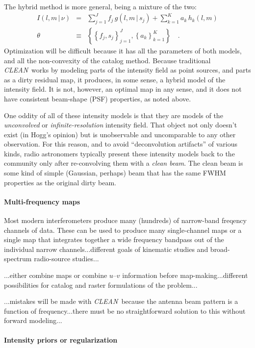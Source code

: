 \documentclass[12pt]{article}
\newcommand{\project}[1]{\textsl{#1}}
\newcommand{\CLEAN}{\project{CLEAN}}
\newcommand{\set}[1]{\left\{{#1}\right\}}
\newcommand{\given}{\,|\,}
\begin{document}
The hybrid method is more general, being a mixture of the two:
\begin{eqnarray}
I(l,m\given\nu) &=& \sum_{j=1}^J f_j\,g(l,m\given s_j)
                  + \sum_{k=1}^K a_k\,h_k(l,m)
\\
\theta &\equiv& \set{\set{f_j, s_j}_{j=1}^J, \set{a_k}_{k=1}^K}
\quad.
\end{eqnarray}
Optimization will be difficult because it has all the parameters of
both models, and all the non-convexity of the catalog method.  Because
traditional \CLEAN\ works by modeling parts of the intensity field as
point sources, and parts as a dirty residual map, it produces, in some
sense, a hybrid model of the intensity field.  It is not, however, an
optimal map in any sense, and it does not have consistent beam-shape
(PSF) properties, as noted above.

One oddity of all of these intensity models is that they are models of
the \emph{unconvolved} or \emph{infinite-resolution} intensity field.
That object not only doesn't exist (in Hogg's opinion) but is
unobservable and uncomparable to any other observation.  For this
reason, and to avoid ``deconvolution artifacts'' of various kinds,
radio astronomers typically present these intensity models back to the
community only after re-convolving them with a \emph{clean beam}.  The
clean beam is some kind of simple (Gaussian, perhaps) beam that has
the same FWHM properties as the original dirty beam.

\paragraph{Multi-frequency maps}

Most modern interferometers produce many (hundreds) of narrow-band
freqency channels of data.  These can be used to produce many
single-channel maps or a single map that integrates together a wide
frequency bandpass out of the individual narrow channels...different
goals of kinematic studies and broad-spectrum radio-source studies...

...either combine maps or combine $u$--$v$ information before
map-making...different possibilities for catalog and raster
formulations of the problem...

...mistakes will be made with \CLEAN\ because the antenna beam pattern
is a function of frequency...there must be no straightforward solution
to this without forward modeling...

\paragraph{Intensity priors or regularization}
\end{document}
